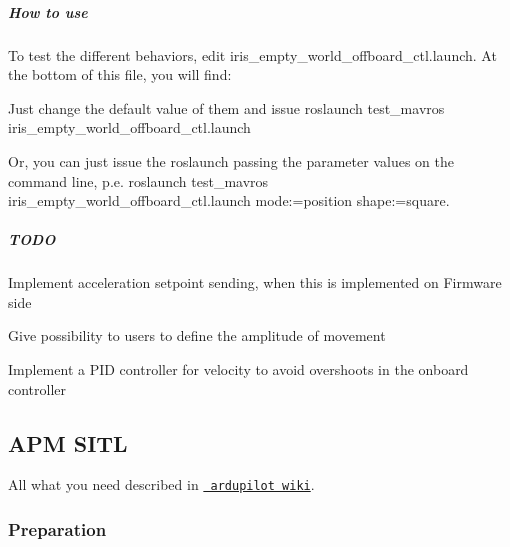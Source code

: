 \subparagraph*{How to use}

To test the different behaviors, edit {\ttfamily iris\+\_\+empty\+\_\+world\+\_\+offboard\+\_\+ctl.\+launch}. At the bottom of this file, you will find\+:


\begin{DoxyCode}{0}
\DoxyCodeLine{\textcolor{comment}{<!-- SITL test base node launcher -->}}
\DoxyCodeLine{<\textcolor{keywordtype}{arg} \textcolor{keyword}{name}=\textcolor{stringliteral}{"mode"} \textcolor{keyword}{default}=\textcolor{stringliteral}{"position"} />    \textcolor{comment}{<!-- position ctl mode -->}}
\DoxyCodeLine{<\textcolor{keywordtype}{arg} \textcolor{keyword}{name}=\textcolor{stringliteral}{"shape"} \textcolor{keyword}{default}=\textcolor{stringliteral}{"square"} />    \textcolor{comment}{<!-- square shaped path -->}}
\end{DoxyCode}


Just change the default value of them and issue {\ttfamily roslaunch test\+\_\+mavros iris\+\_\+empty\+\_\+world\+\_\+offboard\+\_\+ctl.\+launch}

Or, you can just issue the roslaunch passing the parameter values on the command line, p.\+e. {\ttfamily roslaunch test\+\_\+mavros iris\+\_\+empty\+\_\+world\+\_\+offboard\+\_\+ctl.\+launch mode\+:=position shape\+:=square}.

\subparagraph*{T\+O\+DO}


\begin{DoxyItemize}
\item Implement acceleration setpoint sending, when this is implemented on Firmware side
\item Give possibility to users to define the amplitude of movement
\item Implement a P\+ID controller for velocity to avoid overshoots in the onboard controller
\end{DoxyItemize}

\subsection*{A\+PM S\+I\+TL }

All what you need described in \href{http://dev.ardupilot.com/wiki/setting-up-sitl-on-linux/}{\texttt{ ardupilot wiki}}.

\subsubsection*{Preparation}


